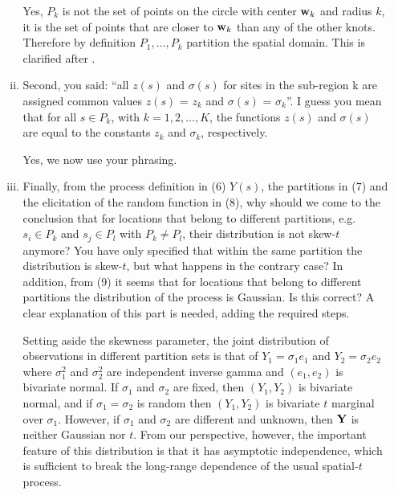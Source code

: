 \documentclass[11pt]{article}
\begin{document}
\begin{enumerate}[1.]
\begin{enumerate}[i.]
    \begin{response}
      Yes, $P_k$ is not the set of points on the circle with center $\mbox{\bf w}_k$ and radius $k$, it is the set of points that are closer to $\mbox{\bf w}_k$ than any of the other knots.
      Therefore by definition $P_1, \ldots, P_k$ partition the spatial domain.
      This is clarified after .
    \end{response}

    \item Second, you said: ``all $z(s)$ and $\sigma(s)$ for sites in the sub-region k are assigned common values $z(s)$ = $z_k$ and $\sigma(s)$ = $\sigma_k$''. I guess you mean that for all $s \in P_k$, with $k = 1, 2, \ldots, K$, the functions $z(s)$ and $\sigma(s)$ are equal to the constants $z_k$ and $\sigma_k$, respectively. \\

    \begin{response}
      Yes, we now use your phrasing.
    \end{response}

    \item Finally, from the process definition in (6) $Y(s)$, the partitions in (7) and the elicitation of the random function in (8), why should we come to the conclusion that for locations that belong to different partitions, e.g. $s_i \in P_k$ and $s_j \in P_l$ with $P_k \neq P_l$, their distribution is not skew-$t$ anymore? You have only specified that within the same partition the distribution is skew-$t$, but what happens in the contrary case? In addition, from (9) it seems that for locations that belong to different partitions the distribution of the process is Gaussian. Is this correct? A clear explanation of this part is needed, adding the required steps. \\

    \begin{response}
      Setting aside the skewness parameter, the joint distribution of observations in different partition sets is that of $Y_1 = \sigma_1 e_1$ and $Y_2 = \sigma_2 e_2$ where $\sigma_1^2$ and $\sigma_2^2$ are independent inverse gamma and $(e_1, e_2)$ is bivariate normal.
      If $\sigma_1$ and $\sigma_2$ are fixed, then $(Y_1, Y_2)$ is bivariate normal, and if $\sigma_1 = \sigma_2$ is random then $(Y_1, Y_2)$ is bivariate $t$ marginal over $\sigma_1$.
      However, if $\sigma_1$ and $\sigma_2$ are different and unknown, then $\mbox{\bf Y}$ is neither Gaussian nor $t$.
      From our perspective, however, the important feature of this distribution is that it has asymptotic independence, which is sufficient to break the long-range dependence of the usual spatial-$t$ process.
    \end{response}


\end{enumerate}
\end{enumerate}
\end{document}
